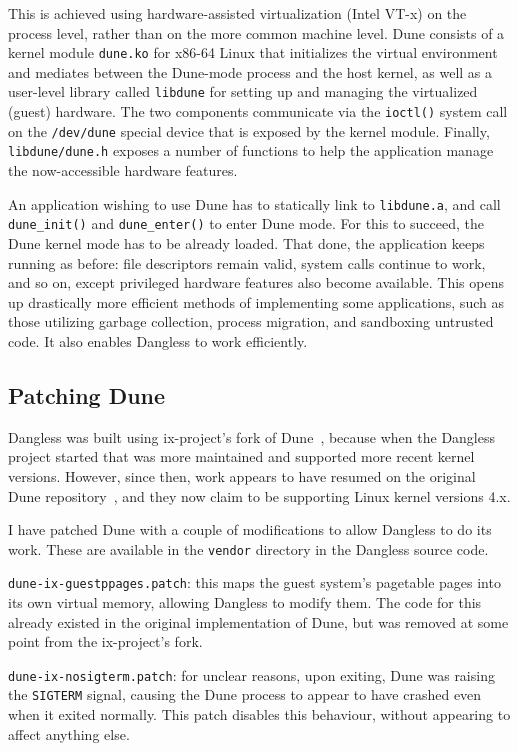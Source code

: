This is achieved using hardware-assisted virtualization (Intel VT-x) on the process level, rather than on the more common machine level. Dune consists of a kernel module \texttt{dune.ko} for x86-64 Linux that initializes the virtual environment and mediates between the Dune-mode process and the host kernel, as well as a user-level library called \texttt{libdune} for setting up and managing the virtualized (guest) hardware. The two components communicate via the \lstinline!ioctl()! system call on the \texttt{/dev/dune} special device that is exposed by the kernel module. Finally, \texttt{libdune/dune.h} exposes a number of functions to help the application manage the now-accessible hardware features.

An application wishing to use Dune has to statically link to \texttt{libdune.a}, and call \lstinline!dune_init()! and \lstinline!dune_enter()! to enter Dune mode. For this to succeed, the Dune kernel mode has to be already loaded. That done, the application keeps running as before: file descriptors remain valid, system calls continue to work, and so on, except privileged hardware features also become available. This opens up drastically more efficient methods of implementing some applications, such as those utilizing garbage collection, process migration, and sandboxing untrusted code. It also enables Dangless to work efficiently.

\subsection{Patching Dune}

Dangless was built using ix-project's fork of Dune~\cite{dune-github-ix}, because when the Dangless project started that was more maintained and supported more recent kernel versions. However, since then, work appears to have resumed on the original Dune repository~\cite{dune-github-original}, and they now claim to be supporting Linux kernel versions 4.x.

I have patched Dune with a couple of modifications to allow Dangless to do its work. These are available in the \texttt{vendor} directory in the Dangless source code.

\texttt{dune-ix-guestppages.patch}: this maps the guest system's pagetable pages into its own virtual memory, allowing Dangless to modify them. The code for this already existed in the original implementation of Dune, but was removed at some point from the ix-project's fork.
 
\texttt{dune-ix-nosigterm.patch}: for unclear reasons, upon exiting, Dune was raising the \lstinline!SIGTERM! signal, causing the Dune process to appear to have crashed even when it exited normally. This patch disables this behaviour, without appearing to affect anything else.

